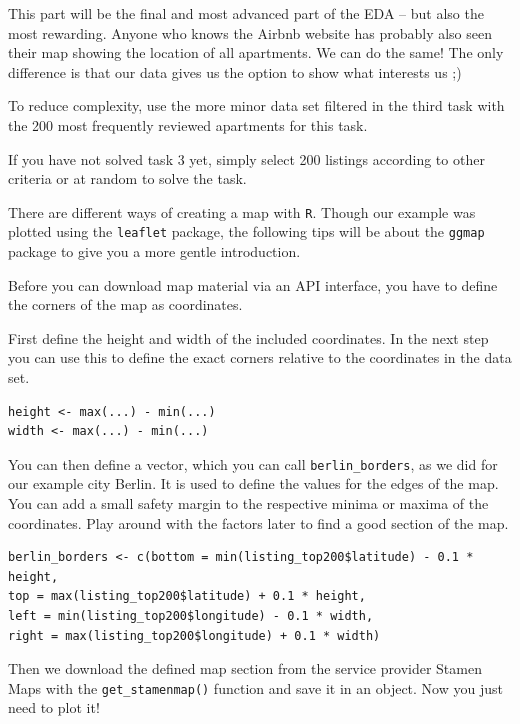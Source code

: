 \documentclass[
  11pt,
]{article}
\newenvironment{tips}[1]
  {
  \begin{itemize}
  \footnotesize
  \renewcommand{\labelitemi}{
    \raisebox{-.7\height}[0pt][0pt]{
      {\setkeys{Gin}{width=3em,keepaspectratio}
        \texttt{[image: images/\#1.png]}}
    }
  }
  \setlength{\fboxsep}{1em}
  \begin{rbox}
  \item
  }
  {
  \end{rbox}
  \end{itemize}
  }
\begin{document}
This part will be the final and most advanced part of the EDA -- but also the most rewarding. Anyone who knows the Airbnb website has probably also seen their map showing the location of all apartments. We can do the same! The only difference is that our data gives us the option to show what interests us ;)

To reduce complexity, use the more minor data set filtered in the third task with the 200 most frequently reviewed apartments for this task.

If you have not solved task 3 yet, simply select 200 listings according to other criteria or at random to solve the task.

\begin{tips}r
There are different ways of creating a map with \texttt{R}. Though our example was plotted using the \texttt{leaflet} package, the following tips will be about the \texttt{ggmap} package to give you a more gentle introduction.

Before you can download map material via an API interface, you have to define the corners of the map as coordinates.

First define the height and width of the included coordinates. In the next step you can use this to define the exact corners relative to the coordinates in the data set.

\begin{verbatim}
height <- max(...) - min(...)
width <- max(...) - min(...)
\end{verbatim}

You can then define a vector, which you can call \texttt{berlin\_borders}, as we did for our example city Berlin. It is used to define the values for the edges of the map. You can add a small safety margin to the respective minima or maxima of the coordinates. Play around with the factors later to find a good section of the map.

\begin{verbatim}
berlin_borders <- c(bottom = min(listing_top200$latitude) - 0.1 * height,
top = max(listing_top200$latitude) + 0.1 * height,
left = min(listing_top200$longitude) - 0.1 * width,
right = max(listing_top200$longitude) + 0.1 * width)
\end{verbatim}

Then we download the defined map section from the service provider Stamen Maps with the \texttt{get\_stamenmap()} function and save it in an object.
Now you just need to plot it!

\end{tips}
\end{document}
